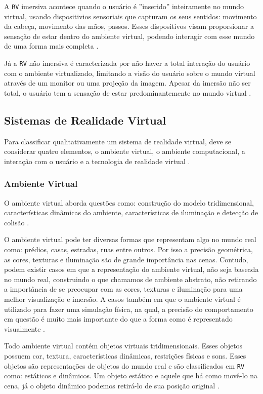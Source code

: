 A  \verb'RV' imersiva acontece quando o usuário é ''inserido'' inteiramente no mundo virtual, usando dispositivios sensoriais que capturam os seus sentidos: movimento da cabeça, movimento das mãos, passos. Esses dispositivos visam proporsionar a sensação de estar dentro do ambiente virtual, podendo interagir com esse mundo de uma forma mais completa \cite{kirner2006}.

Já a \verb'RV' não imersiva é caracterizada por não haver a total interação do usuário com o ambiente virtualizado, limitando a visão do usuário sobre o mundo virtual através de um monitor ou uma projeção da imagem. Apesar da imersão não ser total, o usuário tem a sensação de estar predominantemente no mundo virtual \cite{kirner2006}.


\subsection{Sistemas de Realidade Virtual}
Para classificar qualitativamente um sistema de realidade virtual, deve se considerar quatro elementos, o ambiente virtual, o ambiente computacional, a interação com o usuário e a tecnologia de realidade virtual \cite{kirner2006}.

\subsubsection{Ambiente Virtual}
O ambiente virtual aborda questões como: construção do modelo tridimensional, características dinâmicas do ambiente, características de iluminação e detecção de colisão \cite{kirner2006}.

O ambiente virtual pode ter diversas formas que representam algo no mundo real como: prédios, casas, estradas, ruas entre outros. Por isso a precisão geométrica, as cores, texturas e iluminação são de grande importância nas cenas. Contudo, podem existir casos em que a representação do ambiente virtual, não seja baseada no mundo real, construindo o que chamamos de ambiente abstrato, não retirando a importância de se preocupar com as cores, texturas e iluminação para uma melhor visualização e imersão. A casos também em que o ambiente virtual é utilizado para fazer uma simulação física, na qual, a precisão do comportamento em questão é muito mais importante do que a forma como é representado visualmente \cite{kirner2006}.

Todo ambiente virtual contém objetos virtuais tridimensionais. Esses objetos possuem cor, textura, características dinâmicas, restrições físicas e sons. Esses objetos são representações de objetos do mundo real e são classificados em \verb'RV' como: estáticos e dinâmicos. Um objeto estático e aquele que há como movê-lo na cena, já o objeto dinâmico podemos retirá-lo de sua posição original \cite{kirner2006}.

